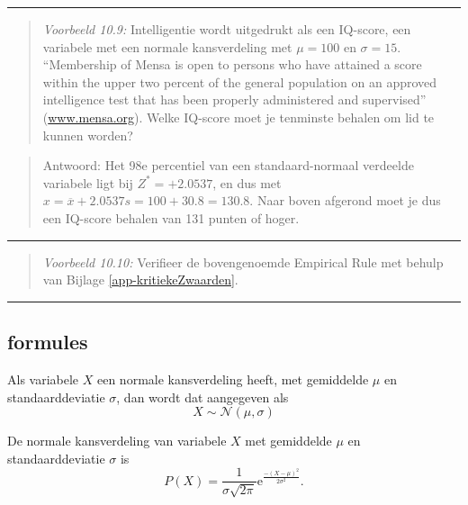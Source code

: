 \documentclass[
]{book}
\begin{document}
\begin{center}\rule{0.5\linewidth}{0.5pt}\end{center}

\begin{quote}
\emph{Voorbeeld 10.9:}
Intelligentie wordt uitgedrukt als een IQ-score, een variabele met een
normale kansverdeling met \(\mu=100\) en \(\sigma=15\). ``Membership of Mensa
is open to persons who have attained a score within the upper two
percent of the general population on an approved intelligence test that
has been properly administered and supervised''
(\url{www.mensa.org}). Welke IQ-score moet je tenminste
behalen om lid te kunnen worden?
\end{quote}

\begin{quote}
Antwoord: Het 98e percentiel van een standaard-normaal verdeelde
variabele ligt bij \(Z^*=+2.0537\), en dus met
\(x=\overline{x}+2.0537 s = 100+30.8 = 130.8\). Naar boven afgerond moet
je dus een IQ-score behalen van 131 punten of hoger.
\end{quote}

\begin{center}\rule{0.5\linewidth}{0.5pt}\end{center}

\begin{quote}
\emph{Voorbeeld 10.10:}
Verifieer de bovengenoemde Empirical Rule met behulp van
Bijlage \ref{app-kritiekeZwaarden}.
\end{quote}

\begin{center}\rule{0.5\linewidth}{0.5pt}\end{center}

\subsection{formules}\label{formules-1}

Als variabele \(X\) een normale kansverdeling heeft, met gemiddelde \(\mu\)
en standaarddeviatie \(\sigma\), dan wordt dat aangegeven als
\begin{equation}
  X \sim \mathcal{N}(\mu,\sigma)
  \label{eq:normaalverdeeld}
\end{equation}

De normale kansverdeling van variabele \(X\) met gemiddelde \(\mu\) en
standaarddeviatie \(\sigma\) is
\begin{equation}
  P(X) = \frac{1}{\sigma \sqrt{2\pi}} \mbox{e}^{ \frac{-(X-\mu)^2}{2\sigma^2} }.
  \label{eq:prob-normal}
\end{equation}
\end{document}
